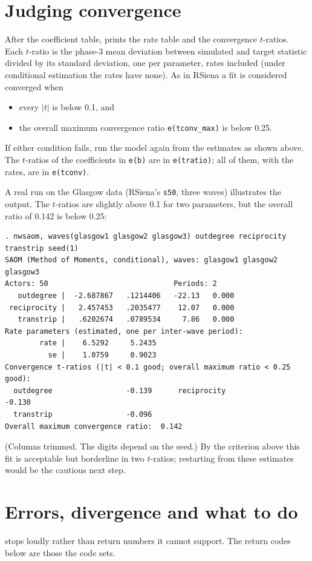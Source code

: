 \section{Judging convergence}
After the coefficient table, \nwsaom{} prints the rate table and the convergence $t$-ratios. Each $t$-ratio is the phase-3 mean deviation between simulated and target statistic divided by its standard deviation, one per parameter, rates included (under conditional estimation the rates have none). As in RSiena a fit is considered converged when
\begin{itemize}
\item every $|t|$ is below 0.1, and
\item the overall maximum convergence ratio \texttt{e(tconv\_max)} is below 0.25.
\end{itemize}
If either condition fails, run the model again from the estimates as shown above. The $t$-ratios of the coefficients in \texttt{e(b)} are in \texttt{e(tratio)}; all of them, with the rates, are in \texttt{e(tconv)}.

A real run on the Glasgow data (RSiena's \texttt{s50}, three waves) illustrates the output. The $t$-ratios are slightly above 0.1 for two parameters, but the overall ratio of 0.142 is below 0.25:
\begin{lstlisting}
. nwsaom, waves(glasgow1 glasgow2 glasgow3) outdegree reciprocity transtrip seed(1)
SAOM (Method of Moments, conditional), waves: glasgow1 glasgow2 glasgow3
Actors: 50                             Periods: 2
   outdegree |  -2.687867   .1214406   -22.13   0.000
 reciprocity |   2.457453   .2035477    12.07   0.000
   transtrip |   .6202674   .0789534     7.86   0.000
Rate parameters (estimated, one per inter-wave period):
        rate |    6.5292     5.2435
          se |    1.0759     0.9023
Convergence t-ratios (|t| < 0.1 good; overall maximum ratio < 0.25 good):
  outdegree                 -0.139      reciprocity               -0.130
  transtrip                 -0.096
Overall maximum convergence ratio:  0.142
\end{lstlisting}
(Columns trimmed. The digits depend on the seed.) By the criterion above this fit is acceptable but borderline in two $t$-ratios; restarting from these estimates would be the cautious next step.

\section{Errors, divergence and what to do}
\nwsaom{} stops loudly rather than return numbers it cannot support. The return codes below are those the code sets.

